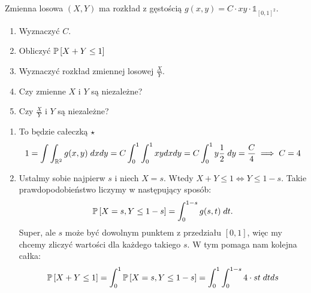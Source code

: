 \documentclass{article}
\begin{document}
\begin{problem}[2]{}
Zmienna losowa $(X, Y)$ ma rozkład z gęstością $g(x,y)=C\cdot xy\cdot\mathds{1}_{[0,1]^2}$.
\begin{enumerate}[label=(\alph*)]
    \item Wyznaczyć $C$.
    \item Obliczyć $\prob{X+Y\leq1}$
    \item Wyznaczyć rozkład zmiennej losowej $\frac{X}{Y}$.
    \item Czy zmienne $X$ i $Y$ są niezależne?
    \item Czy $\frac{X}{Y}$ i $Y$ są niezależne?
\end{enumerate}
\end{problem}

\begin{enumerate}[label=(\alph*), leftmargin=*]
    \item To będzie całeczką $\star$
    \begin{align*}
        1=\int\int_{\mathbb{R}^2}g(x,y)\;dxdy=C\int_0^1\int_0^1xydxdy=C\int_0^1y\frac{1}{2}\;dy=\frac{C}{4}\implies C=4
    \end{align*}
%
    \item Ustalmy sobie najpierw $s$ i niech $X=s$. Wtedy $X+Y\leq 1\iff Y\leq1-s$. Takie prawdopodobieństwo liczymy w następujący sposób:
    $$\prob{X=s, Y\leq 1-s}=\int_0^{1-s}g(s,t)\;dt.$$
    Super, ale $s$ może być dowolnym punktem z przedziału $[0, 1]$, więc my chcemy zliczyć wartości dla każdego takiego $s$. W tym pomaga nam kolejna całka:
    $$\prob{X+Y\leq 1}=\int_0^1\prob{X=s, Y\leq 1-s}=\int_0^1\int_0^{1-s}4\cdot st \;{dtds}$$

\end{enumerate}
\end{document}
